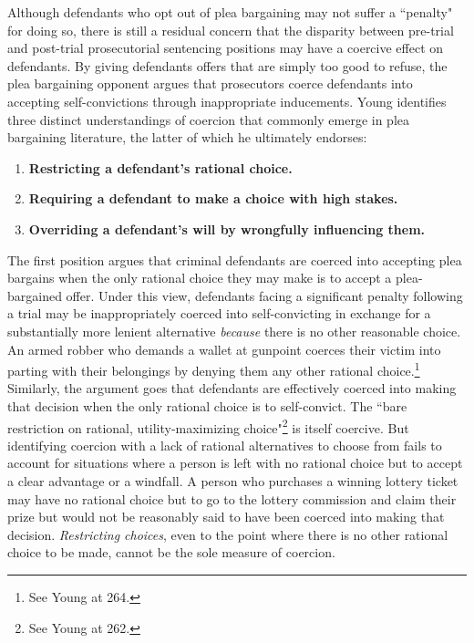 Although defendants who opt out of plea bargaining may not suffer a ``penalty" for doing so, there is still a residual concern that the disparity between pre-trial and post-trial prosecutorial sentencing positions may have a coercive effect on defendants. By giving defendants offers that are simply too good to refuse, the plea bargaining opponent argues that prosecutors coerce defendants into accepting self-convictions through inappropriate inducements. Young identifies three distinct understandings of coercion that commonly emerge in plea bargaining literature, the latter of which he ultimately endorses:

\begin{enumerate}
    \item \textbf{Restricting a defendant's rational choice.}
    \item \textbf{Requiring a defendant to make a choice with high stakes.}
    \item \textbf{Overriding a defendant's will by wrongfully influencing them.}
\end{enumerate}

The first position argues that criminal defendants are coerced into accepting plea bargains when the only rational choice they may make is to accept a plea-bargained offer. Under this view, defendants facing a significant penalty following a trial may be inappropriately coerced into self-convicting in exchange for a substantially more lenient alternative \textit{because} there is no other reasonable choice. An armed robber who demands a wallet at gunpoint coerces their victim into parting with their belongings by denying them any other rational choice.\footnote{See Young at 264.} Similarly, the argument goes that defendants are effectively coerced into making that decision when the only rational choice is to self-convict. The ``bare restriction on rational, utility-maximizing choice"\footnote{See Young at 262.} is itself coercive. But identifying coercion with a lack of rational alternatives to choose from fails to account for situations where a person is left with no rational choice but to accept a clear advantage or a windfall. A person who purchases a winning lottery ticket may have no rational choice but to go to the lottery commission and claim their prize but would not be reasonably said to have been coerced into making that decision. \textit{Restricting choices}, even to the point where there is no other rational choice to be made, cannot be the sole measure of coercion.

